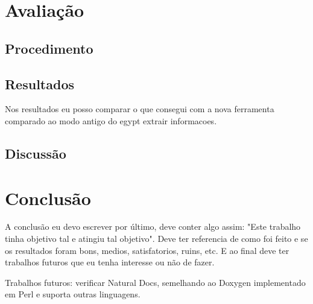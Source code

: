 \chapter{Avaliação}
\section{Procedimento}
\section{Resultados}

Nos resultados eu posso comparar o que consegui com a nova ferramenta comparado ao modo antigo do egypt extrair informacoes.

%
%

\section{Discussão}

\chapter{Conclusão}

A conclusão eu devo escrever por último, deve conter algo assim: "Este trabalho tinha objetivo tal e atingiu tal objetivo". Deve ter referencia de como foi feito e se os resultados foram bons, medios, satisfatorios, ruins, etc. E ao final deve ter trabalhos futuros que eu tenha interesse ou não de fazer.

Trabalhos futuros: verificar Natural Docs, semelhando ao Doxygen implementado em Perl e suporta outras linguagens.
